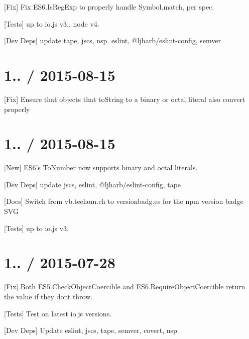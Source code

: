 \begin{DoxyItemize}
\item \mbox{[}Fix\mbox{]} Fix {\ttfamily E\+S6.\+Is\+Reg\+Exp} to properly handle {\ttfamily Symbol.\+match}, per spec.
\item \mbox{[}Tests\mbox{]} up to {\ttfamily io.\+js} {\ttfamily v3.}, {\ttfamily node} {\ttfamily v4.}
\item \mbox{[}Dev Deps\mbox{]} update {\ttfamily tape}, {\ttfamily jscs}, {\ttfamily nsp}, {\ttfamily eslint}, {\ttfamily @ljharb/eslint-\/config}, {\ttfamily semver}
\end{DoxyItemize}

\section*{1.. / 2015-\/08-\/15 }


\begin{DoxyItemize}
\item \mbox{[}Fix\mbox{]} Ensure that objects that {\ttfamily to\+String} to a binary or octal literal also convert properly
\end{DoxyItemize}

\section*{1.. / 2015-\/08-\/15 }


\begin{DoxyItemize}
\item \mbox{[}New\mbox{]} E\+S6’s To\+Number now supports binary and octal literals.
\item \mbox{[}Dev Deps\mbox{]} update {\ttfamily jscs}, {\ttfamily eslint}, {\ttfamily @ljharb/eslint-\/config}, {\ttfamily tape}
\item \mbox{[}Docs\mbox{]} Switch from vb.\+teelaun.\+ch to versionbadg.\+es for the npm version badge S\+VG
\item \mbox{[}Tests\mbox{]} up to {\ttfamily io.\+js} {\ttfamily v3.}
\end{DoxyItemize}

\section*{1.. / 2015-\/07-\/28 }


\begin{DoxyItemize}
\item \mbox{[}Fix\mbox{]} Both {\ttfamily E\+S5.\+Check\+Object\+Coercible} and {\ttfamily E\+S6.\+Require\+Object\+Coercible} return the value if they don\textquotesingle{}t throw.
\item \mbox{[}Tests\mbox{]} Test on latest {\ttfamily io.\+js} versions.
\item \mbox{[}Dev Deps\mbox{]} Update {\ttfamily eslint}, {\ttfamily jscs}, {\ttfamily tape}, {\ttfamily semver}, {\ttfamily covert}, {\ttfamily nsp}
\end{DoxyItemize}

